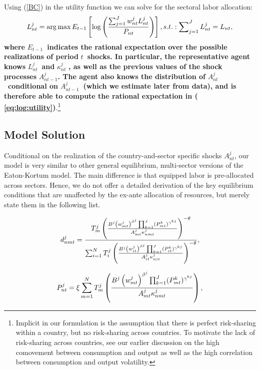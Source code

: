 \documentclass[12pt]{article}
\begin{document}
Using (\ref{BC}) in the utility function we can solve for the sectoral labor
allocation:%
\begin{equation}
L_{nt}^{j}=\arg \max E_{t-1}\left[ \log \left( \frac{%
\sum_{j=1}^{J}w_{nt}^{j}L_{nt}^{j}}{P_{nt}}\right) \right]
,s.t.:\sum\nolimits_{j=1}^{J}L_{nt}^{j}=L_{nt},  \label{eq:log:utility}
\end{equation}%
\textbf{where }$E_{t-1}$\textbf{\ indicates the rational expectation over
the possible realizations of period }$t$\textbf{\ shocks. In particular, the
representative agent knows }$L_{nt}^{j}$\textbf{\ and }$\kappa _{nt}^{j}$%
\textbf{, as well as the previous values of the shock processes }$%
A_{nt-1}^{j}$\textbf{. The agent also knows the distribution of }$A_{nt}^{j}$%
\textbf{\ conditional on }$A_{nt-1}^{j}$\textbf{\ (which we estimate later
from data), and is therefore able to compute the rational expectation in (%
\ref{eq:log:utility})}.\footnote{%
Implicit in our formulation is the assumption that there is perfect
risk-sharing within a country, but no risk-sharing across countries. To
motivate the lack of risk-sharing across countries, see our earlier
discussion on the high comovement between consumption and output as well as
the high correlation between consumption and output volatility.}

\subsection{Model Solution}

Conditional on the realization of the country-and-sector specific shocks $%
A_{nt}^{j}$, our model is very similar to other general equilibrium,
multi-sector versions of the Eaton-Kortum model. The main difference is that
equipped labor is pre-allocated across sectors. Hence, we do not offer a
detailed derivation of the key equilibrium conditions that are unaffected by
the ex-ante allocation of resources, but merely state them in the following
list.

\begin{equation}
d_{nmt}^{j}=\frac{T_{m}^{j}\left( \frac{B^{j}\left( w_{mt}^{j}\right)
^{\beta ^{j}}\prod_{k=1}^{J}(P_{mt}^{k})^{\gamma ^{kj}}}{A_{mt}^{j}\kappa
_{nmt}^{j}}\right) ^{-\theta }} {\sum_{i=1}^{N}T_{i}^{j}\left( \frac{%
B^{j}\left( w_{it}^{j}\right) ^{\beta
^{j}}\prod_{k=1}^{J}(P_{it}^{k})^{\gamma ^{kj}}}{A_{it}^{j}\kappa _{nit}^{j}}%
\right) ^{-\theta }},  \label{shares}
\end{equation}

\begin{equation}
P_{nt}^{j}=\xi \sum_{m=1}^{N}T_{m}^{j}\left( \frac{B^{j}\left(
w_{mt}^{j}\right) ^{\beta ^{j}}\prod_{k=1}^{J}(P_{mt}^{k})^{\gamma ^{kj}}}{%
A_{mt}^{j}\kappa _{nmt}^{j}}\right) ,  \label{eq2}
\end{equation}
\end{document}
